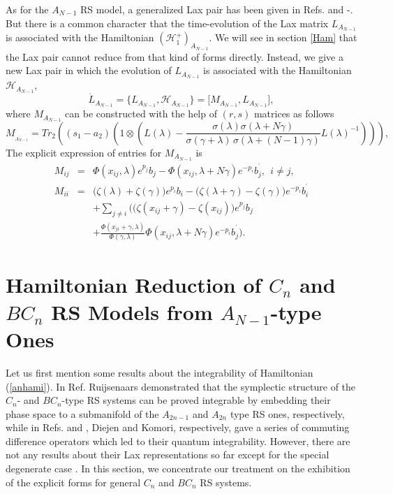 \documentclass[a4paper,12pt]{article}
\begin{document}
As for the $A_{N-1}$ RS model, a generalized Lax pair has
been given in Refs. \cite{nksr,r1} and \cite{bc}-\cite{s2}. But
there is a common character that the time-evolution of the
Lax matrix $L_{A_{N-1}}$ is associated with the Hamiltonian
$(\mathcal{H}_{1}^{+})_{A_{N-1}}$. We will see in section
\ref{Ham} that the Lax pair cannot reduce from that kind of
forms directly. Instead, we give a new Lax pair in which the
evolution of $L_{A_{N-1}}$ is associated with the
Hamiltonian $\mathcal{H}_{A_{N-1}}$,
\begin{equation}
\dot{L}_{A_{N-1}}=\{L_{A_{N-1}},\mathcal{H}_{A_{N-1}}\}=\lbrack
M_{A_{N-1}},L_{A_{N-1}}\rbrack ,  \label{laxeq}
\end{equation}
where $M_{A_{N-1}}$ can be constructed with the help of
$(r,s)$ matrices as follows
\begin{equation}
M_{_{A_{N-1}}}=Tr_{2}((s_{1}-a_{2})(1\otimes (L(\lambda
)-\frac{\sigma (\lambda )\sigma (\lambda +N\gamma )}{\sigma
(\gamma +\lambda )\,\sigma (\lambda +(N-1)\gamma )}L(\lambda
)^{-1}))),
\end{equation}
The explicit expression of entries for $M_{A_{N-1}}$ is
\begin{eqnarray}
M_{ij} &=&\Phi (x_{ij},\lambda )e^{p_{j}}b_{j}-\Phi
(x_{ij},\lambda +N\gamma )e^{-p_{i}}b_{j}^{^{\prime }},~~i\neq j, \\
M_{ii} &=&\Big(\zeta (\lambda )+\zeta (\gamma
)\Big)e^{p_{i}}b_{i}-\Big(
\zeta (\lambda +\gamma )-\zeta (\gamma )\Big)e^{-p_{i}}b_{i}^{^{
\prime }} \\
&&+\sum_{j\neq i}\Big( \Big(\zeta (x_{ij}+\gamma )-\zeta
(x_{ij})\Big) e^{p_{j}}b_{j}  \nonumber \\
&&+\frac{\Phi
(x_{ji}+\gamma ,\lambda )}{\Phi (\gamma ,\lambda )}\Phi
(x_{ij},\lambda +N\gamma )e^{-p_{i}}b_{j}^{^{\prime
}}\Big).
\end{eqnarray}

\section{ Hamiltonian Reduction of $C_{n}$ and $BC_{n}$ RS
Models from $A_{N-1}$-type Ones}
\setcounter{equation}{0} \label{Ham}
Let us first mention some
results about the integrability of Hamiltonian
(\ref{anhami}). In Ref. \cite {r2} Ruijsenaars demonstrated
that the symplectic structure of the $C_{n}$- and
$BC_{n}$-type RS systems can be proved integrable by
embedding their phase space to a submanifold of the
$A_{2n-1}$ and $A_{2n}$ type RS ones, respectively, while in
Refs. \cite{di,di1} and \cite{ko2}, Diejen and Komori,
respectively, gave a series of commuting difference
operators which led to their quantum integrability. However,
there are not any results about their Lax representations so
far except for
the special degenerate	case \cite{kai3,Che00}. In this section, we
concentrate our treatment on the exhibition of the explicit
forms for general $C_{n}$ and $BC_{n}$ RS systems.
\end{document}
